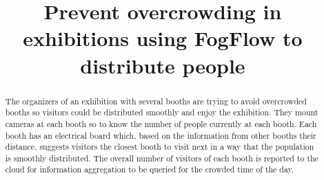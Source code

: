 \documentclass[conference]{ieeeconf}
\title{\LARGE \bf
Prevent overcrowding in exhibitions using FogFlow to distribute people
}
\author{\IEEEauthorblockN{Lorenzo Siega Battel}
\IEEEauthorblockA{lorenzo.siega@mail.polimi.it}}
\begin{document}
\maketitle
\thispagestyle{empty}
\pagestyle{empty}

\begin{abstract}

The organizers of an exhibition with several booths are trying to avoid overcrowded booths so visitors could be distributed smoothly and enjoy the exhibition. They mount cameras at each booth so to know the number of people currently at each booth. Each booth has an electrical board which, based on the information from other booths their distance, suggests visitors the closest booth to visit next in a way that the population is smoothly distributed. The overall number of visitors of each booth is reported to the cloud for information aggregation to be queried for the crowded time of the day.

\end{abstract}
\end{document}
